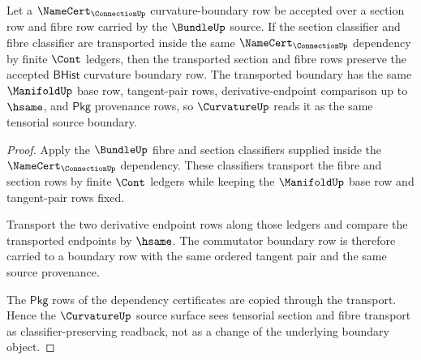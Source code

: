 \begin{theorem}
\label{thm:curvature-tensorial-section-transport}
Let a $\NameCert_{\ConnectionUp}$ curvature-boundary row be accepted over a section row and fibre row carried by the $\BundleUp$ source. If the section classifier and fibre classifier are transported inside the same $\NameCert_{\ConnectionUp}$ dependency by finite $\Cont$ ledgers, then the transported section and fibre rows preserve the accepted $\mathsf{BHist}$ curvature boundary row. The transported boundary has the same $\ManifoldUp$ base row, tangent-pair rows, derivative-endpoint comparison up to $\hsame$, and $\mathsf{Pkg}$ provenance rows, so $\CurvatureUp$ reads it as the same tensorial source boundary.
\end{theorem}
\begin{proof}
Apply the $\BundleUp$ fibre and section classifiers supplied inside the $\NameCert_{\ConnectionUp}$ dependency. These classifiers transport the fibre and section rows by finite $\Cont$ ledgers while keeping the $\ManifoldUp$ base row and tangent-pair rows fixed.

Transport the two derivative endpoint rows along those ledgers and compare the transported endpoints by $\hsame$. The commutator boundary row is therefore carried to a boundary row with the same ordered tangent pair and the same source provenance.

The $\mathsf{Pkg}$ rows of the dependency certificates are copied through the transport. Hence the $\CurvatureUp$ source surface sees tensorial section and fibre transport as classifier-preserving readback, not as a change of the underlying boundary object.
\end{proof}

